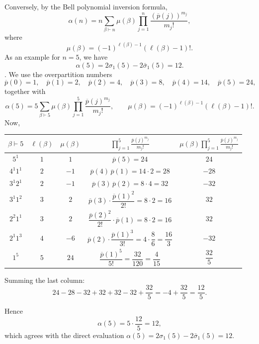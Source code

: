 \documentclass[12pt,oneside,reqno]{amsart}
\numberwithin{equation}{section}
\begin{document}
	Conversely, by the Bell polynomial inversion formula,
	\[
	\alpha(n)
	=
	n
	\sum_{\beta\vdash n}
	\mu(\beta)
	\prod_{j=1}^{n}
	\frac{\left(\overline{p}(j)\right)^{m_j}}{m_j!},
	\]
	where
	\[
	\mu(\beta)
	=
	(-1)^{\ell(\beta)-1}
	(\ell(\beta)-1)!.
	\]
	As an example for $n=5$, we have
	\[
	\alpha(5) = 2\sigma_1(5) - 2\bar\sigma_1(5) = 12.
	\]. We use the overpartition numbers
	\[
	\overline{p}(0)=1,\quad \overline{p}(1)=2,\quad \overline{p}(2)=4,\quad \overline{p}(3)=8,\quad \overline{p}(4)=14,\quad \overline{p}(5)=24,
	\]
	together with
	\[
	\alpha(5) = 5\sum_{\beta \vdash 5} \mu(\beta) \prod_{j=1}^{5} \frac{\overline{p}(j)^{m_j}}{m_j!},
	\qquad
	\mu(\beta) = (-1)^{\ell(\beta)-1}(\ell(\beta)-1)!.
	\]
	Now,
	\begin{center}
		\renewcommand{\arraystretch}{1.6}
		\begin{tabular}{@{}c c c c c@{}}
			\hline
			$\beta \vdash 5$ & $\ell(\beta)$ & $\mu(\beta)$ & 
			$\displaystyle\prod_{j=1}^{5} \frac{\overline{p}(j)^{m_j}}{m_j!}$ & 
			$\displaystyle \mu(\beta)\prod_{j=1}^{5} \frac{\overline{p}(j)^{m_j}}{m_j!}$ \\
			\hline
			$5^1$      & $1$ & $1$   & $\overline{p}(5) = 24$ 
			& $24$ \\
			$4^1 1^1$  & $2$ & $-1$  & $\overline{p}(4)\,\overline{p}(1) = 14 \cdot 2 = 28$ 
			& $-28$ \\
			$3^1 2^1$  & $2$ & $-1$  & $\overline{p}(3)\,\overline{p}(2) = 8 \cdot 4 = 32$ 
			& $-32$ \\
			$3^1 1^2$  & $3$ & $2$   & $\overline{p}(3)\cdot\dfrac{\overline{p}(1)^2}{2!} = 8 \cdot 2 = 16$ 
			& $32$ \\
			$2^2 1^1$  & $3$ & $2$   & $\dfrac{\overline{p}(2)^2}{2!}\cdot \overline{p}(1) = 8 \cdot 2 = 16$ 
			& $32$ \\
			$2^1 1^3$  & $4$ & $-6$  & $\overline{p}(2)\cdot\dfrac{\overline{p}(1)^3}{3!} = 4 \cdot \dfrac{8}{6} = \dfrac{16}{3}$ 
			& $-32$ \\
			$1^5$      & $5$ & $24$  & $\dfrac{\overline{p}(1)^5}{5!} = \dfrac{32}{120} = \dfrac{4}{15}$ 
			& $\dfrac{32}{5}$ \\
			\hline
		\end{tabular}
	\end{center}
	
	Summing the last column:
	\[
	24 - 28 - 32 + 32 + 32 - 32 + \frac{32}{5} = -4 + \frac{32}{5} = \frac{12}{5}.
	\]
	
	Hence
	\[
	\alpha(5) = 5 \cdot \frac{12}{5} = 12,
	\]
	which agrees with the direct evaluation $\alpha(5) = 2\sigma_1(5) - 2\bar\sigma_1(5) = 12$.
	
\end{document}

